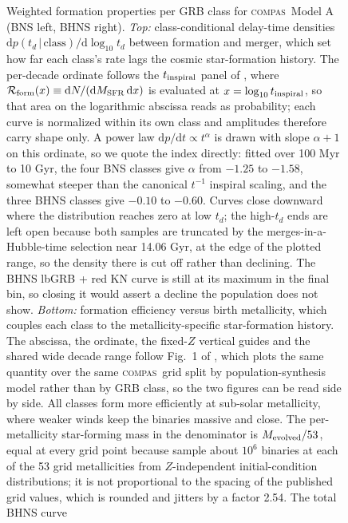 \documentclass[twocolumn,apj]{openjournal}
\newcommand{\compas}{\textsc{compas}}
\begin{document}
\begin{figure}[!tbp]
\par\smallskip
{}
\caption{Weighted formation properties per GRB class for \compas\ Model A
(BNS left, BHNS right). \textit{Top:} class-conditional delay-time
densities $\mathrm{d}p(t_d\,|\,\mathrm{class})/\mathrm{d}\log_{10}t_d$
between formation and merger, which set how far each class's rate lags the
cosmic star-formation history. The per-decade ordinate follows the
$t_{\rm inspiral}$ panel of \citet[][their Fig.~7]{broekgaarden2021}, where
$\mathcal{R}_{\rm form}(x)\equiv\mathrm{d}N/(\mathrm{d}M_{\rm SFR}\,\mathrm{d}x)$
is evaluated at $x=\log_{10}t_{\rm inspiral}$, so that area on the logarithmic
abscissa reads as probability; each curve is normalized within its own class
and amplitudes therefore carry shape only. A power law
$\mathrm{d}p/\mathrm{d}t\propto t^{\alpha}$ is drawn with slope $\alpha+1$ on
this ordinate, so we quote the index directly: fitted over 100 Myr to 10 Gyr,
the four BNS classes give $\alpha$ from $-1.25$ to $-1.58$, somewhat steeper
than the canonical $t^{-1}$ inspiral scaling, and the three BHNS classes give
$-0.10$ to $-0.60$. Curves close downward where the distribution reaches zero
at low $t_d$; the high-$t_d$ ends are left open because both samples are
truncated by the merges-in-a-Hubble-time selection near 14.06 Gyr, at the edge
of the plotted range, so the density there is cut off rather than declining.
The BHNS lbGRB + red KN curve is still at its maximum in the final bin, so
closing it would assert a decline the population does not show. \textit{Bottom:} formation efficiency versus birth
metallicity, which couples each class to the metallicity-specific
star-formation history. The abscissa, the ordinate, the fixed-$Z$ vertical
guides and the shared wide decade range follow Fig.~1 of
\citet{broekgaarden2022}, which plots the same quantity over the same
\compas\ grid split by population-synthesis model rather than by GRB class,
so the two figures can be read side by side. All classes form more efficiently at sub-solar
metallicity, where weaker winds keep the binaries massive and close. The
per-metallicity star-forming mass in the denominator is
$M_{\rm evolved}/53$, equal at every grid point because
\citet[][their Table~1]{broekgaarden2021} sample about $10^{6}$ binaries at
each of the 53 grid metallicities from $Z$-independent initial-condition
distributions; it is not proportional to the spacing of the published grid
values, which is rounded and jitters by a factor 2.54. The total BHNS curve
}
\end{figure}
\end{document}
